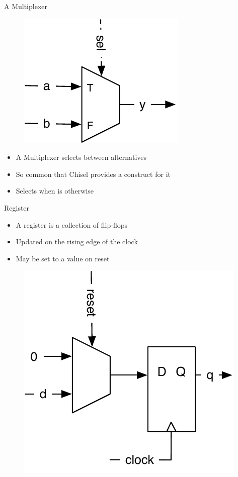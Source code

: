 \begin{frame}[fragile]{A Multiplexer}
\begin{figure}
  \includegraphics[scale=\scale]{../figures/mux}
\end{figure}
\begin{itemize}
\item A Multiplexer selects between alternatives
\item So common that Chisel provides a construct for it
\item Selects  when  is  otherwise 
\end{itemize}
\end{frame}


\begin{frame}[fragile]{Register}
\begin{itemize}
\item A register is a collection of flip-flops
\item Updated on the rising edge of the clock
\item May be set to a value on reset
\end{itemize}
\begin{figure}
  \includegraphics[scale=\scale]{../figures/register-reset-0}
\end{figure}
\end{frame}

